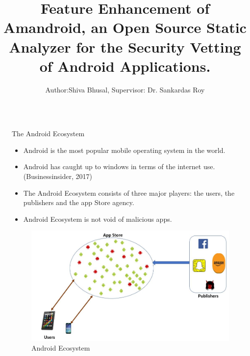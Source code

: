 \documentclass[final,hyperref={pdfpagelabels=false}]{beamer}
\title{\huge Feature Enhancement of Amandroid, an Open Source Static Analyzer for the Security Vetting of Android Applications.} %
\author{Author:Shiva Bhusal, Supervisor: Dr. Sankardas Roy} %
\institute{Department of Computer Science} %
\begin{document}

\begin{frame}[t] %

\begin{columns}[t] %

\begin{column}{.02\textwidth}\end{column} %

\begin{column}{.465\textwidth} %


\begin{block}{The Android Ecosystem}

\begin{itemize}
\item Android is the most popular mobile operating system in the world.
\item Android has caught up to windows in terms of the internet use. (Businessinsider, 2017)
\item The Android Ecosystem consists of three major players: the users, the publishers and the app Store agency. 
\item Android Ecosystem is not void of malicious apps. 
\end{itemize}

\begin{figure}
\includegraphics[width=0.8\linewidth]{AndroidEcoSystem.JPG}
\caption{Android Ecosystem}
\end{figure}


\end{block}
\end{column}
\end{columns}
\end{frame}
\end{document}
